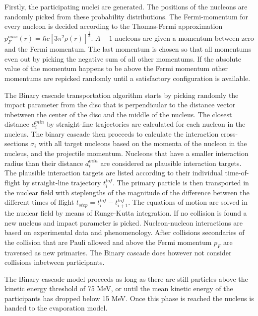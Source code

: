 Firstly, the participating nuclei are generated. The positions of the nucleons are randomly picked from these probability distributions. The Fermi-momentum for every nucleon is decided according to the Thomas-Fermi approximation $p^{max}_F(r) = \hbar c [3 \pi^2 \rho(r)]^\frac{1}{3}$. $A-1$ nucleons are given a momentum between zero and the Fermi momentum. The last momentum is chosen so that all momentums even out by picking the negative sum of all other momentums. If the absolute value of the momentum happens to be above the Fermi momentum other momentums are repicked randomly until a satisfactory configuration is available.

The Binary cascade transportation algorithm starts by picking randomly the impact parameter from the disc that is perpendicular to the distance vector inbetween the center of the disc and the middle of the nucleus. The closest distance $d^{min}_{i}$ by straight-line trajectories are calculated for each nucleon in the nucleus. The binary cascade then proceeds to calculate the interaction cross-sections $\sigma_i$ with all target nucleons based on the momenta of the nucleon in the nucleus, and the projectile momentum. Nucleons that have a smaller interaction radius than their distance $d^{min}_{i}$ are considered as plausible interaction targets. The plausible interaction targets are listed according to their individual time-of-flight by straight-line trajectory $t^{tof}_i$. The primary particle is then transported in the nuclear field with steplengths of the magnitude of the difference between the different times of flight $t_{step} = t^{tof}_i - t^{tof}_{i+1}$. The equations of motion are solved in the nuclear field by means of Runge-Kutta integration. If no collision is found a new nucleus and impact parameter is picked.
Nucleon-nucleon interactions are based on experimental data and phenomenology. After collisions secondaries of the collision that are Pauli allowed and above the Fermi momentum $p_F$ are traversed as new primaries. The Binary cascade does however not consider collisions inbetween participants.

The Binary cascade model proceeds as long as there are still particles above the kinetic energy threshold  of 75 MeV, or until the mean kinetic energy of the participants has dropped below 15 MeV. Once this phase is reached the nucleus is handed to the evaporation model.


